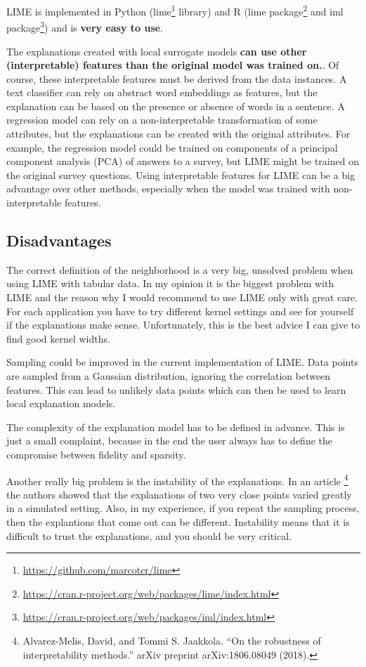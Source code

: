 \documentclass[12pt,]{krantz}
\renewcommand{\href}[2]{#2\footnote{\url{#1}}}
\begin{document}
LIME is implemented in Python
(\href{https://github.com/marcotcr/lime}{lime} library) and R
(\href{https://cran.r-project.org/web/packages/lime/index.html}{lime
package} and
\href{https://cran.r-project.org/web/packages/iml/index.html}{iml
package}) and is \textbf{very easy to use}.

The explanations created with local surrogate models \textbf{can use
other (interpretable) features than the original model was trained on.}.
Of course, these interpretable features must be derived from the data
instances. A text classifier can rely on abstract word embeddings as
features, but the explanation can be based on the presence or absence of
words in a sentence. A regression model can rely on a non-interpretable
transformation of some attributes, but the explanations can be created
with the original attributes. For example, the regression model could be
trained on components of a principal component analysis (PCA) of answers
to a survey, but LIME might be trained on the original survey questions.
Using interpretable features for LIME can be a big advantage over other
methods, especially when the model was trained with non-interpretable
features.

\subsection{Disadvantages}\label{disadvantages-13}

The correct definition of the neighborhood is a very big, unsolved
problem when using LIME with tabular data. In my opinion it is the
biggest problem with LIME and the reason why I would recommend to use
LIME only with great care. For each application you have to try
different kernel settings and see for yourself if the explanations make
sense. Unfortunately, this is the best advice I can give to find good
kernel widths.

Sampling could be improved in the current implementation of LIME. Data
points are sampled from a Gaussian distribution, ignoring the
correlation between features. This can lead to unlikely data points
which can then be used to learn local explanation models.

The complexity of the explanation model has to be defined in advance.
This is just a small complaint, because in the end the user always has
to define the compromise between fidelity and sparsity.

Another really big problem is the instability of the explanations. In an
article \footnote{Alvarez-Melis, David, and Tommi S. Jaakkola. ``On the
  robustness of interpretability methods.'' arXiv preprint
  arXiv:1806.08049 (2018).} the authors showed that the explanations of
two very close points varied greatly in a simulated setting. Also, in my
experience, if you repeat the sampling process, then the explantions
that come out can be different. Instability means that it is difficult
to trust the explanations, and you should be very critical.
\end{document}
